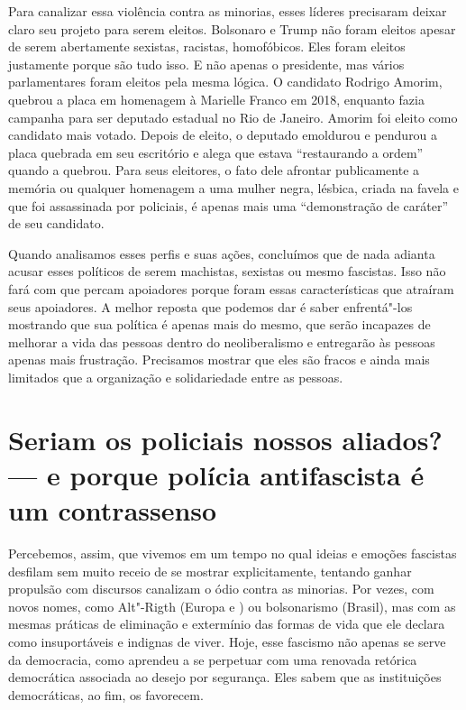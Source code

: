 Para canalizar essa violência contra as minorias, esses líderes precisaram deixar claro seu projeto para serem eleitos. Bolsonaro e Trump não foram eleitos apesar de serem abertamente sexistas, racistas, homofóbicos. Eles foram eleitos justamente porque são tudo isso. E não apenas o presidente, mas vários parlamentares foram eleitos pela mesma lógica. O candidato Rodrigo Amorim, quebrou a placa em homenagem à Marielle Franco em 2018, enquanto fazia campanha para ser deputado estadual no Rio de Janeiro. Amorim foi eleito como candidato mais votado. Depois de eleito, o deputado emoldurou e pendurou a placa quebrada em seu escritório e alega que estava ``restaurando a ordem'' quando a quebrou. Para seus eleitores, o fato dele afrontar publicamente a memória ou qualquer homenagem a uma mulher negra, lésbica, criada na favela e que foi assassinada por policiais, é apenas mais uma ``demonstração de caráter'' de seu candidato.

Quando analisamos esses perfis e suas ações, concluímos que de nada adianta acusar esses políticos de serem machistas, sexistas ou mesmo fascistas. Isso não fará com que percam apoiadores porque foram essas características que atraíram seus apoiadores. A melhor reposta que podemos dar é saber enfrentá"-los mostrando que sua política é apenas mais do mesmo, que serão incapazes de melhorar a vida das pessoas dentro do neoliberalismo e entregarão às pessoas apenas mais frustração. Precisamos mostrar que eles são fracos e ainda mais limitados que a organização e solidariedade entre as pessoas.

\section{Seriam os policiais nossos aliados? --- e porque polícia antifascista é um contrassenso}

Percebemos, assim, que vivemos em um tempo no qual ideias e emoções fascistas desfilam sem muito receio de se mostrar explicitamente, tentando ganhar propulsão com discursos canalizam o ódio contra as minorias. Por vezes, com novos nomes, como Alt"-Rigth (Europa e ) ou bolsonarismo (Brasil), mas com as mesmas práticas de eliminação e extermínio das formas de vida que ele declara como insuportáveis e indignas de viver. Hoje, esse fascismo não apenas se serve da democracia, como aprendeu a se perpetuar com uma renovada retórica democrática associada ao desejo por segurança. Eles sabem que as instituições democráticas, ao fim, os favorecem.

